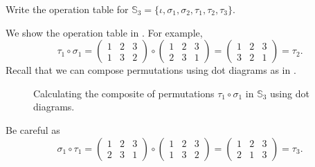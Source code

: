 \begin{exam}
        \begin{apart}
            \item Write the operation table for $\mathbb{S}_3 = \{ \iota, \sigma_1, \sigma_2, \tau_1, \tau_2, \tau_3\}$.
                \begin{soln}
                    We show the operation table in .  For example, $$\tau_1 \circ \sigma_1 = \left( \begin{array}{ccc} 1 & 2 & 3 \\ 1 & 3 & 2\end{array} \right) \circ \left( \begin{array}{ccc} 1 & 2 & 3 \\ 2 & 3 & 1\end{array} \right) = \left( \begin{array}{ccc} 1 & 2 & 3 \\ 3 & 2 & 1\end{array} \right)= \tau_2.$$
                    Recall that we can compose permutations using dot diagrams as in .
                    
                        \begin{figure}[hbtp]
                            \centering
                            
                            \caption{Calculating the composite of permutations $\tau_1 \circ \sigma_1$ in $\mathbb{S}_3$ using dot diagrams.}
                            \label{fig_tau1_sigma1_perms}
                        \end{figure}

                    Be careful as $$\sigma_1 \circ \tau_1 = \left( \begin{array}{ccc} 1 & 2 & 3 \\ 2 & 3 & 1\end{array} \right) \circ \left( \begin{array}{ccc} 1 & 2 & 3 \\ 1 & 3 & 2\end{array} \right) = \left( \begin{array}{ccc} 1 & 2 & 3 \\ 2 & 1 & 3\end{array} \right)= \tau_3.$$
                        

\end{soln}
\end{apart}
\end{exam}
